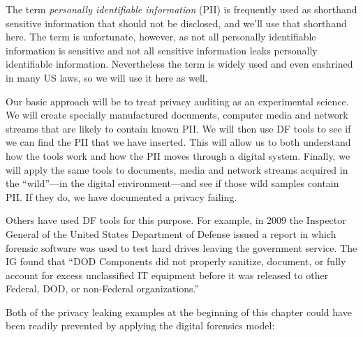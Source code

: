 The term \emph{personally identifiable
  information} (PII) is frequently used as shorthand sensitive
information that should not be disclosed, and we'll use that shorthand
here. The term is unfortunate, however, as not all personally identifiable information is
sensitive and not all sensitive information leaks personally
identifiable information. Nevertheless the term is widely used and
even enshrined in many US laws, so we will use it here as well.

Our basic approach will be to treat privacy auditing as an
experimental science. We will create specially manufactured documents,
computer media and network streams that are likely to contain known
PII. We will then use DF tools to see if we can find the PII that we
have inserted. This will allow us to both understand how the tools
work and how the PII moves through a digital system. Finally, we will
apply the same tools to documents, media and network streams acquired
in the ``wild''---in the digital environment---and see if those wild
samples contain PII. If they do, we have documented a privacy failing.

Others have used DF tools for this purpose. For example, in 2009 the
Inspector General of the United States Department of Defense issued a
report in which forensic software was used to test hard drives leaving
the government service. The IG found that ``DOD Components did not
properly sanitize, document, or fully account for excess unclassified
IT equipment before it was released to other Federal, DOD, or
non-Federal organizations.''\cite{D-2009-104}

Both of the privacy leaking examples at the beginning of this chapter
could have been readily prevented by applying the digital forensics
model:

